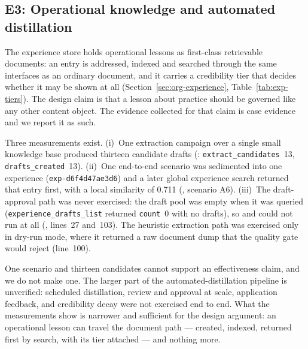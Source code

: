 \subsection{E3: Operational knowledge and automated distillation}
\label{sec:e3}

The experience store holds operational lessons as first-class retrievable
documents: an entry is addressed, indexed and searched through the same
interfaces as an ordinary document, and it carries a credibility tier that
decides whether it may be shown at all
(Section~\ref{sec:org-experience}, Table~\ref{tab:exp-tiers}). The design
claim is that a lesson about practice should be governed like any other
content object. The evidence collected for that claim is case evidence and we
report it as such.

Three measurements exist. (i)~One extraction campaign over a single small
knowledge base produced thirteen candidate drafts
(:
\texttt{extract\_candidates}~13, \texttt{drafts\_created}~13). (ii)~One
end-to-end scenario was sedimented into one experience
(\texttt{exp-d6f4d47ae3d6}) and a later global experience search returned that
entry first, with a local similarity of 0.711
(, scenario A6). (iii)~The draft-approval
path was never exercised: the draft pool was empty when it was queried
(\texttt{experience\_drafts\_list} returned \texttt{count}~0 with no drafts),
so  and 
could not run at all (,
lines~27 and~103). The heuristic extraction path was exercised only in
dry-run mode, where it returned a raw document dump that the quality gate
would reject (line~100).

One scenario and thirteen candidates cannot support an effectiveness claim,
and we do not make one. The larger part of the automated-distillation
pipeline is unverified: scheduled distillation, review and approval at scale,
application feedback, and credibility decay were not exercised end to end.
What the measurements show is narrower and sufficient for the design
argument: an operational lesson can travel the document path --- created,
indexed, returned first by search, with its tier attached --- and nothing more.

